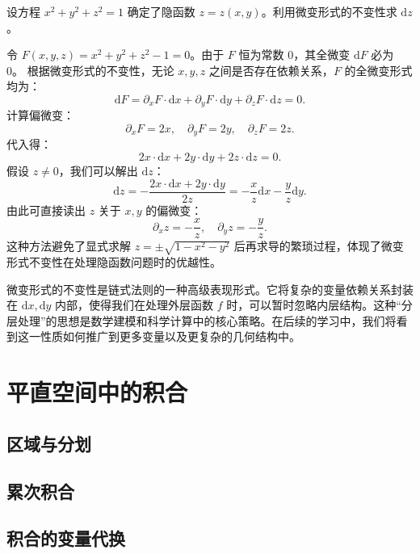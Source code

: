 \documentclass[12pt,UTF8]{ctexbook}
\begin{document}
\begin{et}
设方程 $x^2 + y^2 + z^2 = 1$ 确定了隐函数 $z = z(x, y)$。利用微变形式的不变性求 $\mathrm{d}z$。
\end{et}
\begin{so}
令 $F(x, y, z) = x^2 + y^2 + z^2 - 1 = 0$。由于 $F$ 恒为常数 0，其全微变 $\mathrm{d}F$ 必为 0。
根据微变形式的不变性，无论 $x, y, z$ 之间是否存在依赖关系，$F$ 的全微变形式均为：
$$ \mathrm{d}F = \partial_x F \cdot \mathrm{d}x + \partial_y F \cdot \mathrm{d}y + \partial_z F \cdot \mathrm{d}z = 0. $$
计算偏微变：
$$ \partial_x F = 2x, \quad \partial_y F = 2y, \quad \partial_z F = 2z. $$
代入得：
$$ 2x \cdot \mathrm{d}x + 2y \cdot \mathrm{d}y + 2z \cdot \mathrm{d}z = 0. $$
假设 $z \neq 0$，我们可以解出 $\mathrm{d}z$：
$$ \mathrm{d}z = -\frac{2x \cdot \mathrm{d}x + 2y \cdot \mathrm{d}y}{2z} = -\frac{x}{z} \mathrm{d}x - \frac{y}{z} \mathrm{d}y. $$
由此可直接读出 $z$ 关于 $x, y$ 的偏微变：
$$ \partial_x z = -\frac{x}{z}, \quad \partial_y z = -\frac{y}{z}. $$
这种方法避免了显式求解 $z = \pm\sqrt{1-x^2-y^2}$ 后再求导的繁琐过程，体现了微变形式不变性在处理隐函数问题时的优越性。
\end{so}

微变形式的不变性是链式法则的一种高级表现形式。它将复杂的变量依赖关系封装在 $\mathrm{d}x, \mathrm{d}y$ 内部，使得我们在处理外层函数 $f$ 时，可以暂时忽略内层结构。这种“分层处理”的思想是数学建模和科学计算中的核心策略。在后续的学习中，我们将看到这一性质如何推广到更多变量以及更复杂的几何结构中。

\chapter{平直空间中的积合}

\section{区域与分划}

\section{累次积合}

\section{积合的变量代换}
\end{document}
